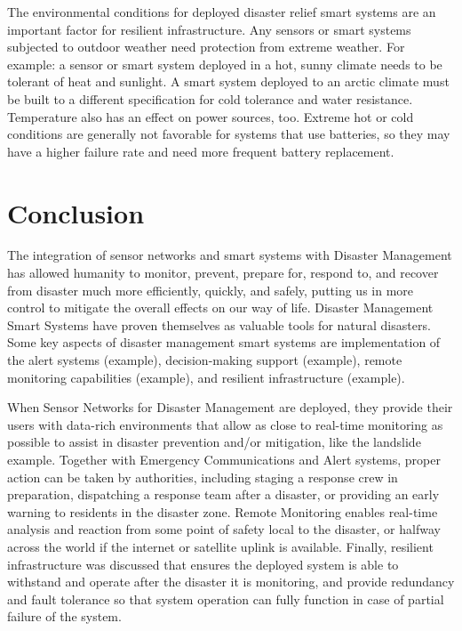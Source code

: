 \documentclass[conference]{IEEEtran}
\begin{document}
The environmental conditions for deployed disaster relief smart systems are an important factor for 
resilient infrastructure. Any sensors or smart systems subjected to outdoor weather need protection 
from extreme weather. For example: a sensor or smart system deployed in a hot, sunny climate needs 
to be tolerant of heat and sunlight. A smart system deployed to an arctic climate must be built 
to a different specification for cold tolerance and water resistance. Temperature also has an
effect on power sources, too. Extreme hot or cold conditions are generally not favorable for
systems that use batteries, so they may have a higher failure rate and need more frequent
battery replacement. \par

\section{Conclusion} %


The integration of sensor networks and smart systems with Disaster Management has allowed humanity
to monitor, prevent, prepare for, respond to, and recover from disaster much more efficiently, quickly, and 
safely, putting us in more control to mitigate the overall effects on our way of life. Disaster Management 
Smart Systems have proven themselves as valuable tools for natural disasters. Some key aspects of 
disaster management smart systems are implementation of the alert systems (example), decision-making 
support (example), remote monitoring capabilities (example), and resilient infrastructure (example).\par

When Sensor Networks for Disaster Management are deployed, they provide their users with data-rich 
environments that allow as close to real-time monitoring as possible to assist in disaster prevention
and/or mitigation, like the landslide example. Together with Emergency Communications and Alert
systems, proper action can be taken by authorities, including staging a response crew in preparation, 
dispatching a response team after a disaster, or providing an early warning to residents in the
disaster zone. Remote Monitoring enables real-time analysis and reaction from some point of 
safety local to the disaster, or halfway across the world if the internet or satellite uplink 
is available. Finally, resilient infrastructure was discussed that ensures the deployed system
is able to withstand and operate after the disaster it is monitoring, and provide redundancy 
and fault tolerance so that system operation can fully function in case of partial failure 
of the system.\par
\end{document}
